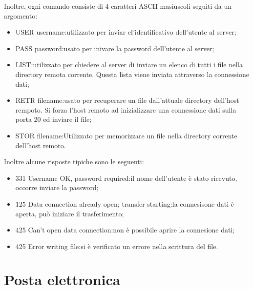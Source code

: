 \documentclass{book}
\begin{document}
Inoltre, ogni comando consiste di 4 caratteri ASCII masiuscoli seguiti da un
argomento:
\begin{itemize}
  \item USER username:\quad utilizzato per inviar el'identificativo
  dell'utente al server;
  
  \item PASS password:\quad usato per inivare la password dell'utente al
  server;
  
  \item LIST:\quad utilizzato per chiedere al server di inviare un elenco di
  tutti i file nella directory remota corrente. Questa lista viene inviata
  attraverso la connessione dati;
  
  \item RETR filename:\quad usato per recuperare un file dall'attuale
  directory dell'host rempoto. Si forza l'host remoto ad inizializzare una
  connessione dati sulla porta 20 ed inviare il file;
  
  \item STOR filename:\quad Utilizzato per memorizzare un file nella directory
  corrente dell'host remoto.
\end{itemize}
Inoltre alcune risposte tipiche sono le seguenti:
\begin{itemize}
  \item 331 Username OK, password required:\quad il nome dell'utente {\`e}
  stato ricevuto, occorre inviare la password;
  
  \item 125 Data connection already open; transfer starting:\quad la
  connesisone dati {\`e} aperta, pu{\`o} iniziare il trasferimento;
  
  \item 425 Can't open data connection:\quad non {\`e} possibile aprire la
  connesione dati;
  
  \item 425 Error writing file:\quad si {\`e} verificato un errore nella
  scrittura del file.
\end{itemize}

\section{Posta elettronica}
\end{document}
